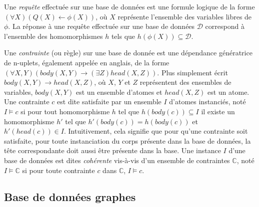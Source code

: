 Une \emph{requête} effectuée sur une base de données est une formule logique de la forme $(\forall X)(Q(X) \gets \phi(X))$, où $X$ représente l'ensemble des variables libres de $\phi$.
La réponse à une requête effectuée sur une base de données $\mathcal{D}$ correspond à l'ensemble des homomorphismes $h$ tels que $h(\phi(X)) \subseteq \mathcal{D}$.

Une \emph{contrainte} (ou règle) sur une base de donnée est une dépendance génératrice de n-uplets, également appelée  en anglais, de la forme $(\forall X, Y)(body(X, Y) \to (\exists Z)head(X, Z))$.
Plus simplement écrit $body(X, Y) \to head(X, Z)$, où $X$, $Y$ et $Z$ représentent des ensembles de variables, $body(X, Y)$ est un ensemble d'atomes et $head(X, Z)$ est un atome.
Une contrainte $c$ est dite satisfaite par un ensemble $I$ d'atomes instanciés, noté $I \vDash c$ si pour tout homomorphisme $h$ tel que $h(body(c)) \subseteq I$ il existe un homomorphisme $h'$ tel que $h'(body(c)) = h(body(c))$ et $h'(head(c)) \in I$.
Intuitivement, cela signifie que pour qu'une contrainte soit satisfaite, pour toute instanciation du corps présente dans la base de données, la tête correspondante doit aussi être présente dans la base.
Une instance $I$ d'une base de données est dites \emph{cohérente} vis-à-vis d'un ensemble de contraintes $\mathbb{C}$, noté $I \vDash \mathbb{C}$ si pour toute contrainte $c$ dans $\mathbb{C}$, $I \vDash c$.

\subsection{Base de données graphes}
\label{sec:update:pre:graph}


